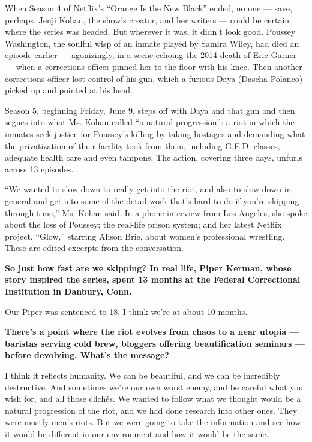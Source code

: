 When Season 4 of Netflix's ``Orange Is the New Black'' ended, no one ---
save, perhaps, Jenji Kohan, the show's creator, and her writers ---
could be certain where the series was headed. But wherever it was, it
didn't look good. Poussey Washington, the soulful wisp of an inmate
played by Samira Wiley, had died an episode earlier --- agonizingly, in
a scene echoing the 2014 death of Eric Garner --- when a corrections
officer pinned her to the floor with his knee. Then another corrections
officer lost control of his gun, which a furious Daya (Dascha Polanco)
picked up and pointed at his head.

Season 5, beginning Friday, June 9, steps off with Daya and that gun and
then segues into what Ms. Kohan called ``a natural progression'': a riot
in which the inmates seek justice for Poussey's killing by taking
hostages and demanding what the privatization of their facility took
from them, including G.E.D. classes, adequate health care and even
tampons. The action, covering three days, unfurls across 13 episodes.

``We wanted to slow down to really get into the riot, and also to slow
down in general and get into some of the detail work that's hard to do
if you're skipping through time,'' Ms. Kohan said. In a phone interview
from Los Angeles, she spoke about the loss of Poussey; the real-life
prison system; and her latest Netflix project, ``Glow,'' starring Alison
Brie, about women's professional wrestling. These are edited excerpts
from the conversation.

\textbf{So just how fast are we skipping? In real life, Piper Kerman,
whose story inspired the series, spent 13 months at the Federal
Correctional Institution in Danbury, Conn.}

Our Piper was sentenced to 18. I think we're at about 10 months.

\textbf{There's a point where the riot evolves from chaos to a near
utopia --- baristas serving cold brew, bloggers offering beautification
seminars --- before devolving. What's the message?}

I think it reflects humanity. We can be beautiful, and we can be
incredibly destructive. And sometimes we're our own worst enemy, and be
careful what you wish for, and all those clichés. We wanted to follow
what we thought would be a natural progression of the riot, and we had
done research into other ones. They were mostly men's riots. But we were
going to take the information and see how it would be different in our
environment and how it would be the same.

